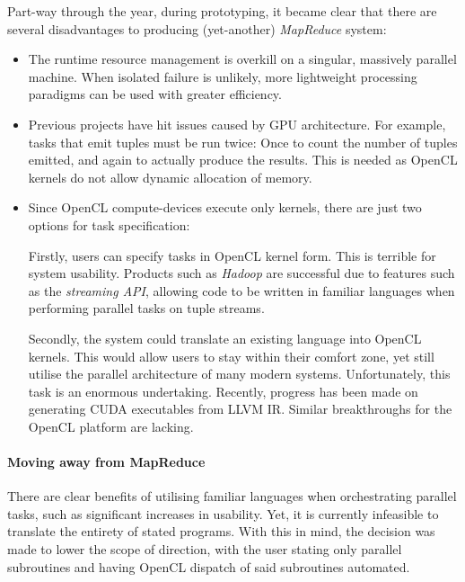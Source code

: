 Part-way through the year, during prototyping, it became clear that there are several disadvantages to producing (yet-another) \emph{MapReduce} system:
\begin{itemize}
\item The runtime resource management is overkill on a singular, massively parallel machine. When isolated failure is unlikely, more lightweight processing paradigms can be used with greater efficiency.

\item Previous projects have hit issues caused by \ac{GPU} architecture. For example, tasks that emit tuples must be run twice: Once to count the number of tuples emitted, and again to actually produce the results. This is needed as \ac{OpenCL} kernels do not allow dynamic allocation of memory.

\item Since \ac{OpenCL} compute-devices execute only kernels, there are just two options for task specification:

Firstly, users can specify tasks in \ac{OpenCL} kernel form. This is terrible for system usability. Products such as \emph{Hadoop} are successful due to features such as the \emph{streaming \ac{API}}, allowing code to be written in familiar languages when performing parallel tasks on tuple streams.

Secondly, the system could translate an existing language into \ac{OpenCL} kernels. This would allow users to stay within their comfort zone, yet still utilise the parallel architecture of many modern systems. Unfortunately, this task is an enormous undertaking. Recently, progress has been made on generating \ac{CUDA} executables from LLVM \ac{IR}. Similar breakthroughs for the \ac{OpenCL} platform are lacking.
\end{itemize}

\paragraph*{Moving away from MapReduce}
There are clear benefits of utilising familiar languages when orchestrating parallel tasks, such as significant increases in usability.
Yet, it is currently infeasible to translate the entirety of stated programs.
With this in mind, the decision was made to lower the scope of direction, with the user stating only parallel subroutines and having \ac{OpenCL} dispatch of said subroutines automated.

